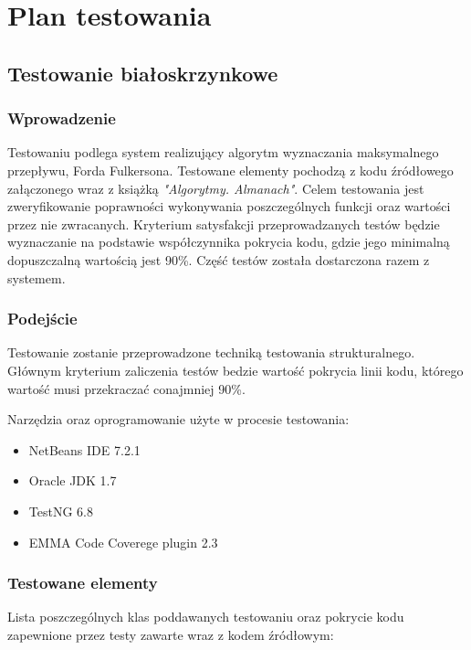 \documentclass[10pt]{dokument-tiwo}
\begin{document}
\MakeDokumentMeta


\section{Plan testowania}
\subsection{Testowanie białoskrzynkowe}
\subsubsection{Wprowadzenie}
Testowaniu podlega system realizujący algorytm wyznaczania maksymalnego przepływu, Forda Fulkersona. Testowane elementy pochodzą 
z kodu źródłowego załączonego wraz z książką \emph{"Algorytmy. Almanach"}. Celem testowania jest zweryfikowanie poprawności wykonywania poszczególnych 
funkcji oraz wartości przez nie zwracanych. Kryterium satysfakcji przeprowadzanych testów będzie wyznaczanie na podstawie współczynnika pokrycia kodu, gdzie 
jego minimalną dopuszczalną wartością jest 90\%. Część testów została dostarczona razem z systemem.  

\subsubsection{Podejście}
Testowanie zostanie przeprowadzone techniką testowania strukturalnego. Głównym kryterium zaliczenia testów bedzie wartość pokrycia linii kodu, którego 
wartość musi przekraczać conajmniej 90\%.

Narzędzia oraz oprogramowanie użyte w procesie testowania:
    \begin{itemize}
        \item NetBeans IDE 7.2.1
        \item Oracle JDK 1.7
        \item TestNG 6.8
        \item EMMA Code Coverege plugin 2.3
    \end{itemize}

\subsubsection{Testowane elementy}
Lista poszczególnych klas poddawanych testowaniu oraz pokrycie kodu zapewnione przez testy zawarte wraz z kodem źródłowym:
\end{document}
